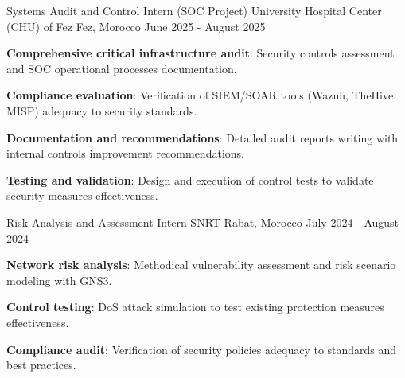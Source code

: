 
\begin{cventries}

    \cventry
    {Systems Audit and Control Intern (SOC Project)} %
    {University Hospital Center (CHU) of Fez} %
    {Fez, Morocco} %
    {June 2025 - August 2025} %
    {
        \begin{cvitems}
            \item {
                        \textbf{Comprehensive critical infrastructure audit}: Security controls assessment and SOC operational processes documentation.}
            \item {
                        \textbf{Compliance evaluation}: Verification of SIEM/SOAR tools (Wazuh, TheHive, MISP) adequacy to security standards.}
            \item {
                        \textbf{Documentation and recommendations}: Detailed audit reports writing with internal controls improvement recommendations.}
            \item {
                        \textbf{Testing and validation}: Design and execution of control tests to validate security measures effectiveness.}
        \end{cvitems}
    }

    \cventry
    {Risk Analysis and Assessment Intern} %
    {SNRT} %
    {Rabat, Morocco} %
    {July 2024 - August 2024} %
    {
        \begin{cvitems} %
            \item {\textbf{Network risk analysis}: Methodical vulnerability assessment and risk scenario modeling with GNS3.}
            \item {\textbf{Control testing}: DoS attack simulation to test existing protection measures effectiveness.}
            \item {\textbf{Compliance audit}: Verification of security policies adequacy to standards and best practices.}
        \end{cvitems}
    }


\end{cventries}

